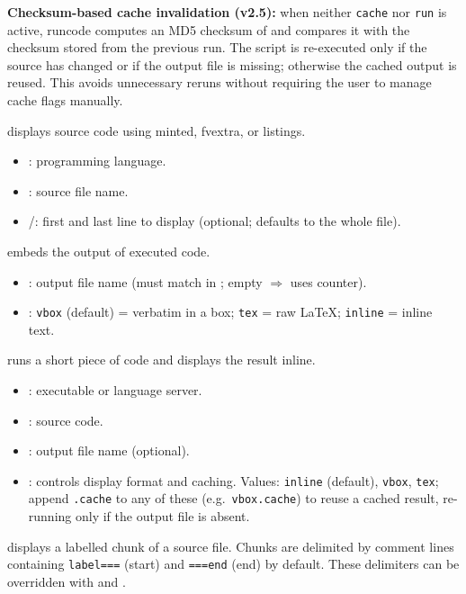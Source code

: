 \documentclass{ltxdoc}
\newcommand{\pkg}[1]{\textsf{#1}}
\newcommand{\opt}[1]{\texttt{#1}}
\begin{document}
\textbf{Checksum-based cache invalidation (v2.5):} when neither
\opt{cache} nor \opt{run} is active, \pkg{runcode} computes an MD5
checksum of  and compares it with the checksum stored from the
previous run.  The script is re-executed only if the source has changed
or if the output file is missing; otherwise the cached output is reused.
This avoids unnecessary reruns without requiring the user to manage
cache flags manually.

\DescribeMacro{\showCode}
displays source code using \pkg{minted}, \pkg{fvextra}, or \pkg{listings}.
\begin{itemize}
  \item {}: programming language.
  \item {}: source file name.
  \item {}/: first and last line to display
    (optional; defaults to the whole file).
\end{itemize}

embeds the output of executed code.
\begin{itemize}
  \item {}: output file name (must match  in
    ; empty $\Rightarrow$ uses counter).
  \item {}: \texttt{vbox} (default) = verbatim in a box;
    \texttt{tex} = raw \LaTeX{}; \texttt{inline} = inline text.
\end{itemize}

\DescribeMacro{\inln}
runs a short piece of code and displays the result inline.
\begin{itemize}
  \item {}: executable or language server.
  \item {}: source code.
  \item {}: output file name (optional).
  \item {}: controls display format and caching.  Values:
    \texttt{inline} (default), \texttt{vbox}, \texttt{tex};
    append \texttt{.cache} to any of these
    (e.g.\ \texttt{vbox.cache}) to reuse a cached result,
    re-running only if the output file is absent.
\end{itemize}

\DescribeMacro{\showChunk}
displays a labelled chunk of a source file.  Chunks are delimited by
comment lines containing \texttt{label===} (start) and
\texttt{===end} (end) by default.  These delimiters can be overridden
with  and .
\end{document}
